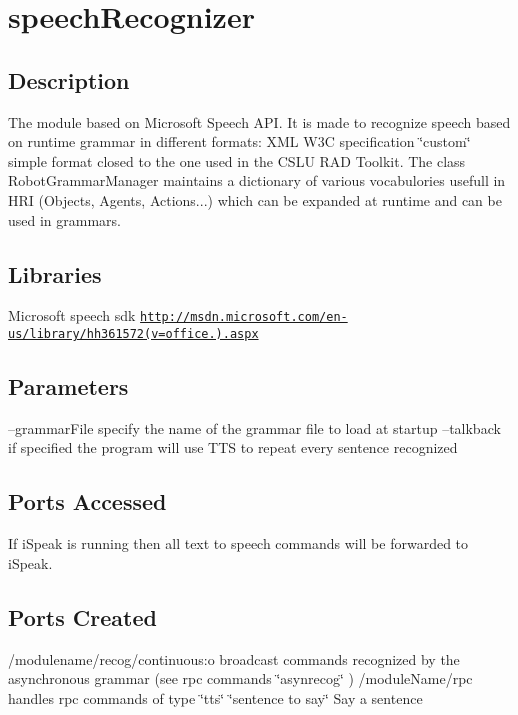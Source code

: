 \section{speech\+Recognizer}
\label{group__icub__speechRecognizer}
\hypertarget{group__windows-tts_intro_sec}{}\subsection{Description}\label{group__windows-tts_intro_sec}
The module based on Microsoft Speech A\+PI. It is made to recognize speech based on runtime grammar in different formats\+: X\+ML W3C specification \char`\"{}custom\char`\"{} simple format closed to the one used in the C\+S\+LU R\+AD Toolkit. The class Robot\+Grammar\+Manager maintains a dictionary of various vocabulories usefull in H\+RI (Objects, Agents, Actions...) which can be expanded at runtime and can be used in grammars.\hypertarget{group__windows-tts_lib_sec}{}\subsection{Libraries}\label{group__windows-tts_lib_sec}
Microsoft speech sdk \href{http://msdn.microsoft.com/en-us/library/hh361572(v=office.14).aspx}{\tt http\+://msdn.\+microsoft.\+com/en-\/us/library/hh361572(v=office.).\+aspx}\hypertarget{group__windows-tts_parameters_sec}{}\subsection{Parameters}\label{group__windows-tts_parameters_sec}
--grammar\+File specify the name of the grammar file to load at startup --talkback if specified the program will use T\+TS to repeat every sentence recognized\hypertarget{group__windows-tts_portsa_sec}{}\subsection{Ports Accessed}\label{group__windows-tts_portsa_sec}
If i\+Speak is running then all text to speech commands will be forwarded to i\+Speak.\hypertarget{group__windows-tts_portsc_sec}{}\subsection{Ports Created}\label{group__windows-tts_portsc_sec}
/modulename/recog/continuous\+:o broadcast commands recognized by the asynchronous grammar (see rpc commands \char`\"{}asynrecog\char`\"{} ) /module\+Name/rpc handles rpc commands of type \char`\"{}tts\char`\"{} \char`\"{}sentence to say\char`\"{} Say a sentence

